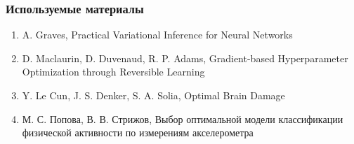 \documentclass[10pt,pdf,utf8,russian,aspectratio=169]{beamer}
\begin{document}
\begin{frame}
\frametitle{Используемые материалы}
\begin{enumerate}
\item A. Graves, Practical Variational Inference for Neural Networks
\item D. Maclaurin, D. Duvenaud, R. P. Adams, Gradient-based Hyperparameter Optimization through Reversible Learning
\item Y. Le Cun, J. S. Denker, S. A. Solia, Optimal Brain Damage 
\item М. С. Попова, В. В. Стрижов, Выбор оптимальной модели классификации физической активности по измерениям акселерометра
\end{enumerate}
\end{frame}
\end{document}
